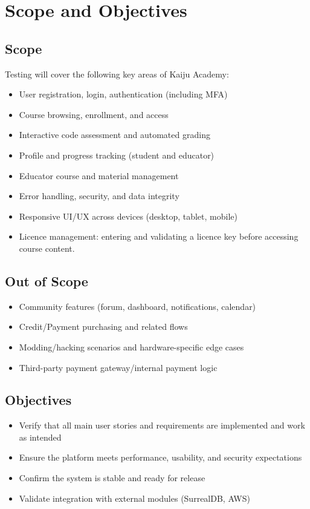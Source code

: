 \documentclass[a4paper,11pt]{scrartcl}
\begin{document}
\section{Scope and Objectives}

\subsection{Scope}
Testing will cover the following key areas of Kaiju Academy:
\begin{itemize}[leftmargin=*]
    \item User registration, login, authentication (including MFA)
    \item Course browsing, enrollment, and access
    \item Interactive code assessment and automated grading
    \item Profile and progress tracking (student and educator)
    \item Educator course and material management
    \item Error handling, security, and data integrity
    \item Responsive UI/UX across devices (desktop, tablet, mobile)
    \item Licence management: entering and validating a licence key before accessing course content.
\end{itemize}

\subsection{Out of Scope}
\begin{itemize}[leftmargin=*]
    \item Community features (forum, dashboard, notifications, calendar)
    \item Credit/Payment purchasing and related flows
    \item Modding/hacking scenarios and hardware-specific edge cases
    \item Third-party payment gateway/internal payment logic
\end{itemize}

\subsection{Objectives}
\begin{itemize}[leftmargin=*]
    \item Verify that all main user stories and requirements are implemented and work as intended
    \item Ensure the platform meets performance, usability, and security expectations
    \item Confirm the system is stable and ready for release
    \item Validate integration with external modules (SurrealDB, AWS)
\end{itemize}
\end{document}
